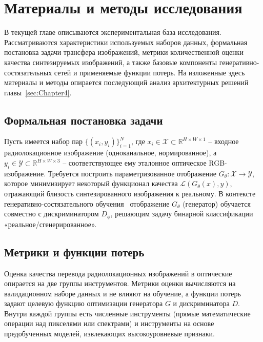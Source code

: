 \chapter{Материалы и методы исследования}
\label{sec:Chapter2} 

В текущей главе описываются экспериментальная база исследования.
Рассматриваются характеристики используемых наборов данных, формальная постановка задачи трансфера изображений, метрики количественной оценки качества синтезируемых изображений, а также базовые компоненты генеративно-состязательных сетей и применяемые функции потерь.
На изложенные здесь материалы и методы опирается последующий анализ архитектурных решений главы~\ref{sec:Chapter4}.

\section{Формальная постановка задачи}
\label{sec:problem_formulation}

Пусть имеется набор пар $\{(x_i, y_i)\}_{i=1}^N$, где $x_i \in \mathcal{X} \subset \mathbb{R}^{H \times W \times 1}$ -- входное радиолокационное изображение (одноканальное, нормированное), а $y_i \in \mathcal{Y} \subset \mathbb{R}^{H \times W \times 3}$ -- соответствующее ему эталонное оптическое RGB-изображение.
Требуется построить параметризованное отображение $G_\theta: \mathcal{X} \to \mathcal{Y}$, которое минимизирует некоторый функционал качества $\mathcal{L}(G_\theta(x), y)$, отражающий близость синтезированного изображения к реальному.
В контексте генеративно-состязательного обучения~\cite{goodfellow2020generative} отображение $G_\theta$ (генератор) обучается совместно с дискриминатором $D_\phi$, решающим задачу бинарной классификации «реальное/сгенерированное».

\section{Метрики и функции потерь}
\label{sec:metrics_losses}

Оценка качества перевода радиолокационных изображений в оптические опирается на две группы инструментов.
Метрики оценки вычисляются на валидационном наборе данных и не влияют на обучение, а функции потерь задают целевую функцию оптимизации генератора $G$ и дискриминатора $D$.
Внутри каждой группы есть численные инструменты (прямые математические операции над пикселями или спектрами) и инструменты на основе предобученных моделей, извлекающих высокоуровневые признаки.

